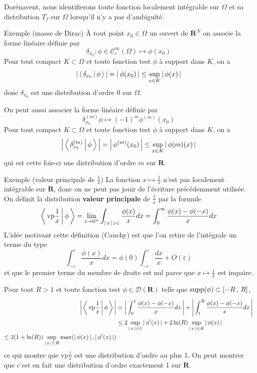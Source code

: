         Dorénavent, nous identifierons toute fonction localement intégrable sur $\Omega$ et sa distribution $T_f$ sur $\Omega$ lorsqu’il n’y a pas d’ambiguïté. 

        \begin{demo}{Exemple (masse de Dirac)}
            À tout point $x_0 \in \Omega$ un ouvert de $\mathbf{R}^N$ on associe la forme linéaire définie par 
            \[ \delta_{x_0} : \phi \in \mathcal{C}_c^{\infty}(\Omega) \mapsto \phi(x_0) \]    
            Pour tout compact $K \subset \Omega$ et toute fonction test $\phi$ à support dans $K$, on a 
            \[ \left\lvert \, \left< \, \delta_{x_0} \, \middle| \, \phi \, \right> \, \right\rvert = \left\lvert \, \phi(x_0) \, \right\rvert \leq \sup_{x \in K} \left\lvert \, \phi(x) \, \right\rvert \]   
            donc $\delta_{x_0}$ est une distribution d’ordre $0$ sur $\Omega$.

            On peut aussi associer la forme linéaire définie par 
            \[ \delta_{x_0}^{(m)} \phi \mapsto (-1)^m \phi^{(m)}(x_0) \]   
            Pour tout compact $K \subset \Omega$ et toute fonction test $\phi$ à support dans $K$, on a 
            \[ \left\lvert \, \left< \, \delta_{x_0}^{(m)} \, \middle| \, \phi \, \right> \, \right\rvert = \left\lvert \, \phi^{(m)}(x_0) \, \right\rvert \leq \sup_{x \in K} \left\lvert \, \phi{(m)}(x) \, \right\rvert \]  
            qui est cette fois-ci une distribution d’ordre $m$ sur $\mathbf{R}$. 
        \end{demo}

        \begin{demo}{Exemple (valeur principale de $\frac{1}{x}$)}
            La fonction $x \mapsto \frac{1}{x}$ n’est pas localement intégrable sur $\mathbf{R}$, donc on ne peut pas jouir de l’écriture précédemment utilisée. On définit la distribution \textbf{valeur principale} de $\frac{1}{x}$ par la formule 
            \[ \left< \, \text{vp}\frac{1}{x} \, \middle| \, \phi \, \right> = \lim_{\varepsilon \to 0^+} \int_{\left\lvert \, x \, \right\rvert > \varepsilon} \frac{\phi(x)}{x} dx = \int_{0}^{\infty} \frac{\phi(x) - \phi(-x)}{x}dx \]   
            L’idée motivant cette définition (Cauchy) est que l’on retire de l’intégrale un terme du type 
            \[ \int_{-\varepsilon}^{\varepsilon} \frac{\phi(x)}{x} dx = \phi(0) \int_{-\varepsilon}^{\varepsilon} \frac{dx}{x} + O(\varepsilon) \]  
            et que le premier terme du membre de droite est nul parce que $x \mapsto \frac{1}{x}$ est impaire.

            Pour tout $R > 1$ et toute fonction test $\phi \in \mathcal{D}(\mathbf{R})$ telle que $\text{supp}(\phi) \subset \left[ -R \, , \, R \right]$, 
            \begin{align*}
                \left\lvert \, \left< \, \text{vp}\frac{1}{x} \, \middle| \, \phi \, \right>  \, \right\rvert
                &= \left\lvert \, \int_{0}^{1} \frac{\phi(x) - \phi(-x)}{x} dx \, \right\rvert + \left\lvert \, \int_{1}^{R} \frac{\phi(x)- \phi(-x)}{x}dx \, \right\rvert \\
                &\leq 2 \sup_{\left\lvert \, x \, \right\rvert \leq 1} \left\lvert \, \phi'(x) \, \right\rvert + 2 \ln(R) \sup_{\left\lvert \, x \, \right\rvert \leq R}\left\lvert \, \phi(x) \, \right\rvert \\
                \leq 2(1 + \ln(R)) \sup_{\left\lvert \, x \, \right\rvert \leq R} \max(\left\lvert \, \phi(x) \, \right\rvert, \left\lvert \, \phi'(x) \, \right\rvert)
            \end{align*}
            ce qui montre que $\text{vp}\frac{1}{x}$ est une distribution d’ordre au plus 1. On peut montrer que c’est en fait une distribution d’ordre exactement 1 sur $\mathbf{R}$.
        \end{demo}

